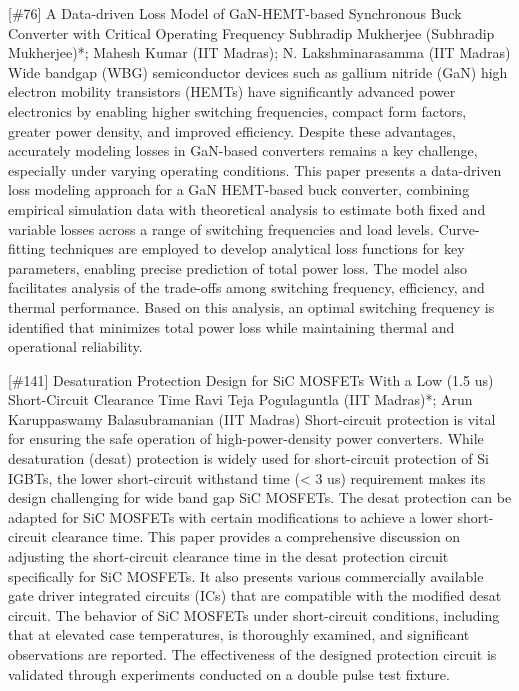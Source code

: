 {} \begin{abstract_online} {[\#76] A Data-driven Loss Model of GaN-HEMT-based  Synchronous Buck Converter with Critical  Operating Frequency} {} {Subhradip Mukherjee (Subhradip Mukherjee)*; Mahesh Kumar (IIT Madras); N. Lakshminarasamma (IIT Madras)} {} Wide bandgap (WBG) semiconductor devices such as gallium nitride (GaN) high electron mobility transistors (HEMTs) have significantly advanced power electronics by enabling higher switching frequencies, compact form factors, greater power density, and improved efficiency. Despite these advantages, accurately modeling losses in GaN-based converters remains a key challenge, especially under varying operating conditions. This paper presents a data-driven loss modeling approach for a GaN HEMT-based buck converter, combining empirical simulation data with theoretical analysis to estimate both fixed and variable losses across a range of switching frequencies and load levels. Curve-fitting techniques are employed to develop analytical loss functions for key parameters, enabling precise prediction of total power loss. The model also facilitates analysis of the trade-offs among switching frequency, efficiency, and thermal performance. Based on this analysis, an optimal switching frequency is identified that minimizes total power loss while maintaining thermal and operational reliability. \end{abstract_online} 
{} \begin{abstract_online} {[\#141] Desaturation Protection Design for SiC MOSFETs With a Low (1.5 us) Short-Circuit Clearance Time} {} {Ravi Teja Pogulaguntla (IIT Madras)*; Arun Karuppaswamy Balasubramanian (IIT Madras)} {} Short-circuit protection is vital for ensuring the safe operation of high-power-density power converters. While desaturation (desat) protection is widely used for short-circuit protection of Si IGBTs, the lower short-circuit withstand time (< 3 us) requirement makes its design challenging for wide band gap SiC MOSFETs. The desat protection can be adapted for SiC MOSFETs with certain modifications to achieve a lower short-circuit clearance time. This paper provides a comprehensive discussion on adjusting the short-circuit clearance time in the desat protection circuit specifically for SiC MOSFETs. It also presents various commercially available gate driver integrated circuits (ICs) that are compatible with the modified desat circuit. The behavior of SiC MOSFETs under short-circuit conditions, including that at elevated case temperatures, is thoroughly examined, and significant observations are reported. The effectiveness of the designed protection circuit is validated through experiments conducted on a double pulse test fixture. \end{abstract_online} 
